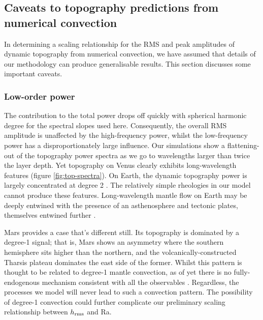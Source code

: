 \documentclass[trackchanges]{aastex63}
\begin{document}
\subsection{Caveats to topography predictions from numerical convection}  \label{sec:discussion-modelling}

In determining a scaling relationship for the RMS and peak amplitudes of dynamic topography from numerical convection, we have assumed that details of our methodology can produce generalisable results. This section discusses some important caveats.

\subsubsection{Low-order power} 
\label{sec:discussion-loworder}
The contribution to the total power drops off quickly with spherical harmonic degree for the spectral slopes used here. Consequently, the overall RMS amplitude is unaffected by the high-frequency power, whilst the low-frequency power has a disproportionately large influence. Our simulations show a flattening-out of the topography power spectra as we go to wavelengths larger than twice the layer depth. Yet topography on Venus clearly exhibits long-wavelength features (figure \ref{fig:top-spectra}). On Earth, the dynamic topography power is largely concentrated at degree 2 \citep{hoggard_global_2016, 2021GeoJI.225.1637Y}. The relatively simple rheologies in our model cannot produce these features. Long-wavelength mantle flow on Earth may be deeply entwined with the presence of an asthenosphere and tectonic plates, themselves entwined further \citep{lenardic_toward_2019}.

Mars provides a case that's different still. Its topography is dominated by a degree-1 signal; that is, Mars shows an asymmetry where the southern hemisphere sits higher than the northern, and the volcanically-constructed Tharsis plateau dominates the east side of the former. Whilst this pattern is thought to be related to degree-1 mantle convection, as of yet there is no fully-endogenous mechanism consistent with all the observables \citep{roberts_chapter_2021}. Regardless, the processes we model will never lead to such a convection pattern. The possibility of degree-1 convection could further complicate our preliminary scaling relationship between $h_{\rm rms}$ and Ra.
\end{document}
